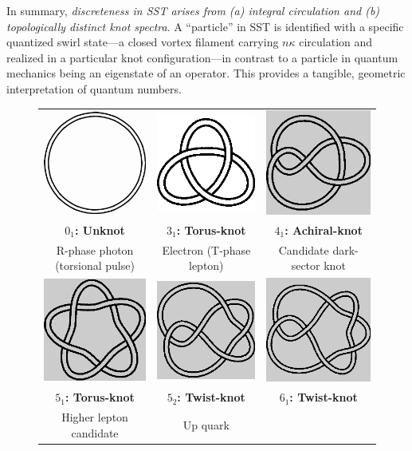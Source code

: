 \documentclass[reprint,aps,onecolumn,nofootinbib]{revtex4-2}
\begin{document}
	In summary, \emph{discreteness in SST arises from (a) integral circulation and (b) topologically distinct knot spectra}. A “particle” in SST is identified with a specific quantized swirl state—a closed vortex filament carrying $n\kappa$ circulation and realized in a particular knot configuration—in contrast to a particle in quantum mechanics being an eigenstate of an operator. This provides a tangible, geometric interpretation of quantum numbers.



	\begin{figure}[htbp]
        \centering
        \setlength{\tabcolsep}{8pt}
        \renewcommand{\arraystretch}{1.2}
        \begin{tabular}{ccc}
        \includegraphics[width=0.04\linewidth]{0_1} &
        \includegraphics[width=0.04\linewidth]{a3_1} &
        \includegraphics[width=0.04\linewidth]{4_1} \\
        \textbf{$0_1$: Unknot} &
        \textbf{$3_1$: Torus-knot} &
        \textbf{$4_1$: Achiral-knot} \\
        \small R-phase photon (torsional pulse) &
        \small Electron (T-phase lepton) &
        \small Candidate dark-sector knot \\[4pt]
        \includegraphics[width=0.04\linewidth]{5_1} &
        \includegraphics[width=0.04\linewidth]{5_2} &
        \includegraphics[width=0.04\linewidth]{6_1} \\
        \textbf{$5_1$: Torus-knot}&
        \textbf{$5_2$: Twist-knot}&
        \textbf{$6_1$: Twist-knot}\\
        \small Higher lepton candidate &
        \small Up quark &

\end{tabular}
\end{figure}
\end{document}

